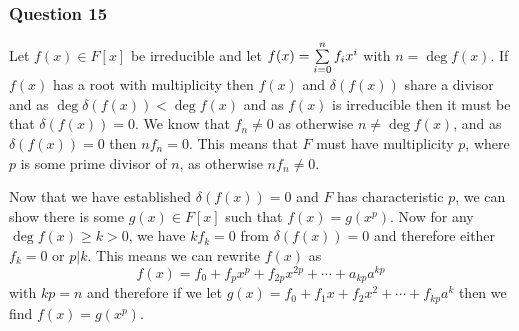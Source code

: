 \documentclass{article}
\begin{document}
\def\LB{}\def \RB{}
\subsubsection{Question 15}
 Let $f(x)\in F[x]$ be irreducible and let $f(x)=\sumfrom{i=0}{n}{f_ix^i}$ with $n=\deg f(x)$. If $f(x)$ has a root with multiplicity then $f(x)$ and $\delta(f(x))$ share a divisor and as $\deg \delta(f(x)) < \deg f(x)$ and as $f(x)$ is irreducible then it must be that $\delta(f(x)) = 0$. We know that $f_n \not=0$ as otherwise $n\not=\deg f(x)$, and as $\delta(f(x)) = 0$ then $nf_n=0$. This means that $F$ must have multiplicity $p$, where $p$ is some prime divisor of $n$, as otherwise $nf_n\not=0$.

 Now that we have established $\delta(f(x)) = 0$ and $F$ has characteristic $p$, we can show there is some $g(x)\in F[x]$ such that $f(x) = g(x^p)$. Now for any $\deg f(x)\ge k>0$, we have $kf_k = 0$ from $\delta(f(x)) = 0$ and therefore either $f_k = 0$ or $p|k$. This means we can rewrite $f(x)$ as $$f(x) = f_0+f_px^p+f_{2p}x^{2p}+\cdots+a_{kp}a^{kp}$$ with $kp = n$ and therefore if we let $g(x)=f_0+f_1x+f_2x^2+\cdots+f_{kp}a^k$ then we find $f(x) = g(x^p)$.
\end{document}

